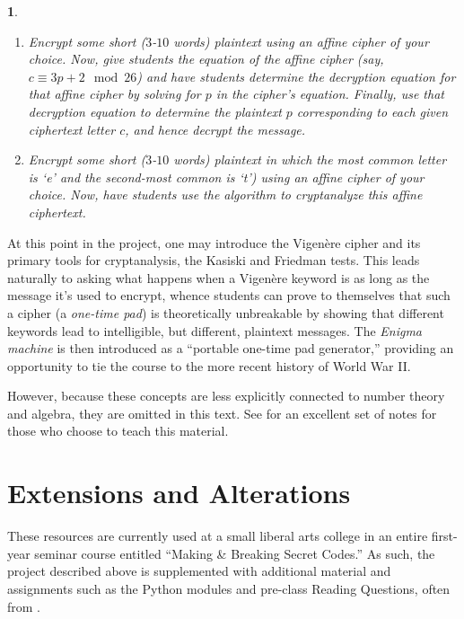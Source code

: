 \documentclass[11pt]{article}
\theoremstyle{plain}
\theoremstyle{remark}
\theoremstyle{definition}
\theoremstyle{definition}
\theoremstyle{definition}
\theoremstyle{plain}
\theoremstyle{plain}
\theoremstyle{plain}
\newtheorem{act}[thm]{\protect\activityname}
\theoremstyle{definition}
\providecommand{\activityname}{Activity}
\begin{document}
\begin{act}
\begin{enumerate}
\item Encrypt some short ($3$-$10$ words) plaintext using an affine cipher of your choice. Now, give students the equation of the affine cipher (say, $c\equiv 3p+2\mod26$) and have students determine the \textit{decryption equation} for that affine cipher by solving for $p$ in the cipher's equation. Finally, use that decryption equation to determine the plaintext $p$ corresponding to each given ciphertext letter $c$, and hence decrypt the message.
\item Encrypt some short ($3$-$10$ words) plaintext \textit{in which the most common letter is `e' and the second-most common is `t')} using an affine cipher of your choice. Now, have students use the algorithm to cryptanalyze this affine ciphertext.
	
\end{enumerate}
\end{act}


At this point in the project, one may introduce the Vigen\`{e}re
cipher and its primary tools for cryptanalysis, the Kasiski and Friedman
tests. This leads naturally to asking what happens when a Vigen\`{e}re
keyword is as long as the message it's used to encrypt, whence students
can prove to themselves that such a cipher (a \textit{one-time pad})
is theoretically unbreakable by showing that different keywords lead
to intelligible, but different, plaintext messages. The \textit{Enigma
machine }is then introduced as a ``portable one-time pad generator,''
providing an opportunity to tie the course to the more recent history
of World War II.

However, because these concepts are less explicitly connected to number
theory and algebra, they are omitted in this text. See \cite{mcdevittClassNotesCryptologic2012}
for an excellent set of notes for those who choose to teach this material.


\section{\label{KI-sec:Extensions-and-Alterations}Extensions and Alterations}

These resources are currently used at a small liberal arts college in an entire first-year seminar course entitled
``Making \& Breaking Secret Codes.'' As such, the project
described above is supplemented with additional material and assignments such as the
Python modules \cite{inceResourcesFirstYearCollege2022} and pre-class
Reading Questions, often from \cite{singhCodeBookScience2011}. 
\end{document}
